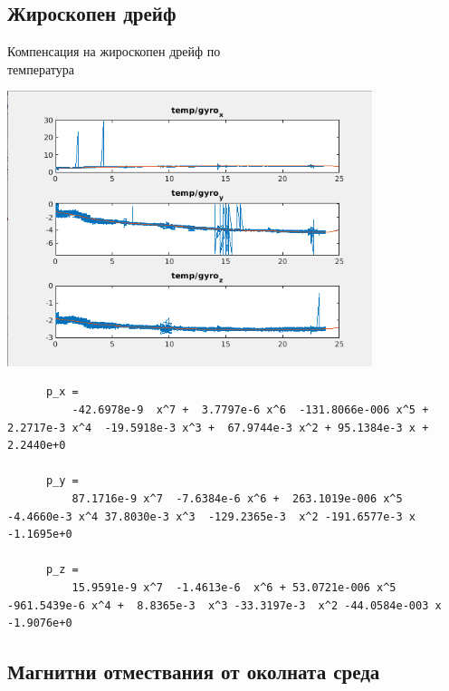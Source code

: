 \documentclass[handout]{beamer}
\begin{document}
\subsection{Жироскопен дрейф}

\begin{frame}{Компенсация на жироскопен дрейф по\\температура}

    \includegraphics[width=0.8\textwidth]{Images/gyro_drift_calibrate.png}

\end{frame}

\begin{frame}[fragile]

	\begin{verbatim}
	  p_x = 
		  -42.6978e-9  x^7 +  3.7797e-6 x^6  -131.8066e-006 x^5 + 2.2717e-3 x^4  -19.5918e-3 x^3 +  67.9744e-3 x^2 + 95.1384e-3 x + 2.2440e+0
	
	  p_y =
		  87.1716e-9 x^7  -7.6384e-6 x^6 +  263.1019e-006 x^5  -4.4660e-3 x^4 37.8030e-3 x^3  -129.2365e-3  x^2 -191.6577e-3 x -1.1695e+0
	
	  p_z =
		  15.9591e-9 x^7  -1.4613e-6  x^6 + 53.0721e-006 x^5  -961.5439e-6 x^4 +  8.8365e-3  x^3 -33.3197e-3  x^2 -44.0584e-003 x -1.9076e+0
	\end{verbatim}
	\end{frame}


\subsection{Магнитни отмествания от околната среда}
\end{document}
